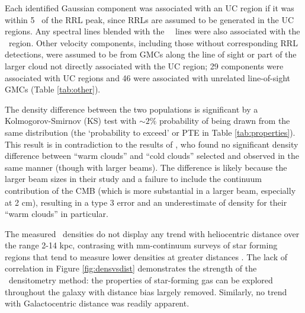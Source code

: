 Each identified Gaussian component was associated with an UC region
if it was within 5 \kms\ of the RRL peak, since RRLs are assumed to be
generated in the UC regions.  Any spectral lines blended with the
\uchii\ \formaldehyde\ lines were also associated with the \uchii\ region.
Other velocity components, including those without corresponding RRL
detections, were assumed to be from GMCs along the line of sight or part of the
larger cloud not directly associated with the UC region; 29
components were associated with UC regions and 46 were associated
with unrelated line-of-sight GMCs (Table \ref{tab:other}).

The density difference between the two populations is significant by a
Kolmogorov-Smirnov (KS) test with $\sim2\%$ probability of being drawn from the
same distribution (the `probability to exceed' or PTE in Table
\ref{tab:properties}). This result is in contradiction to the results of
\citet{Wadiak1988}, who found no significant density difference between ``warm
clouds'' and ``cold clouds'' selected and observed in the same manner (though
with larger beams).  The difference is likely because the larger beam sizes in
their study and a failure to include the continuum contribution of the CMB
(which is more substantial in a larger beam, especially at 2 cm), resulting in
a type 3 error and an underestimate of density for their ``warm clouds'' in
particular.


The measured \hh\ densities do not display any trend with heliocentric distance
over the range 2-14 kpc, contrasing with mm-continuum surveys of star forming
regions that tend to measure lower densities at greater distances
\citep{Reid2010}.  The lack of correlation in Figure \ref{fig:densvsdist}
demonstrates the strength of the \formaldehyde\ densitometry method: the
properties of star-forming gas can be explored throughout the galaxy with
distance bias largely removed.   Similarly, no trend with
Galactocentric distance was readily apparent.

